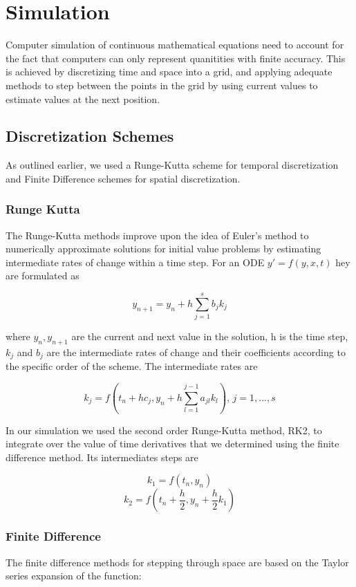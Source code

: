 \documentclass{article}
\begin{document}
\section{Simulation}
Computer simulation of continuous mathematical equations need to account for the fact that computers can only represent quanitities with finite accuracy. This is achieved by discretizing time and space into a grid, and applying adequate methods to step between the points in the grid by using current values to estimate values at the next position.

\subsection{Discretization Schemes}

As outlined earlier, we used a Runge-Kutta scheme for temporal discretization and Finite Difference schemes for spatial discretization.

\subsubsection*{Runge Kutta}

The Runge-Kutta methods improve upon the idea of Euler's method to numerically approximate solutions for initial value problems by estimating intermediate rates of change within a time step. For an ODE $y' = f(y,x,t)$ hey are formulated as

$$y_{n+1} = y_n + h \sum_{j=1}^s b_j k_j$$

where $y_n, y_{n+1}$ are the current and next value in the solution, h is the time step,  $k_j$ and $b_j$ are the intermediate rates of change and their coefficients according to the specific order of the scheme. The intermediate rates are

$$k_j = f\left(t_n + h c_j, y_n + h \sum_{l=1}^{j-1} a_{jl} k_l \right),\,j=1,...,s$$

In our simulation we used the second order Runge-Kutta method, RK2, to integrate over the value of time derivatives that we determined using the finite difference method. Its intermediates steps are

$$k_1 = f(t_n, y_n )$$
$$k_2 = f \left( t_n+\frac{h}{2}, y_n+\frac{h}{2}k_1 \right)$$

\subsubsection*{Finite Difference}
The finite difference methods for stepping through space are based on the Taylor series expansion of the function:
\end{document}
